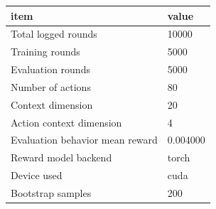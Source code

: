 \begin{tabular}{ll}
\toprule
item & value \\
\midrule
Total logged rounds & 10000 \\
Training rounds & 5000 \\
Evaluation rounds & 5000 \\
Number of actions & 80 \\
Context dimension & 20 \\
Action context dimension & 4 \\
Evaluation behavior mean reward & 0.004000 \\
Reward model backend & torch \\
Device used & cuda \\
Bootstrap samples & 200 \\
\bottomrule
\end{tabular}
